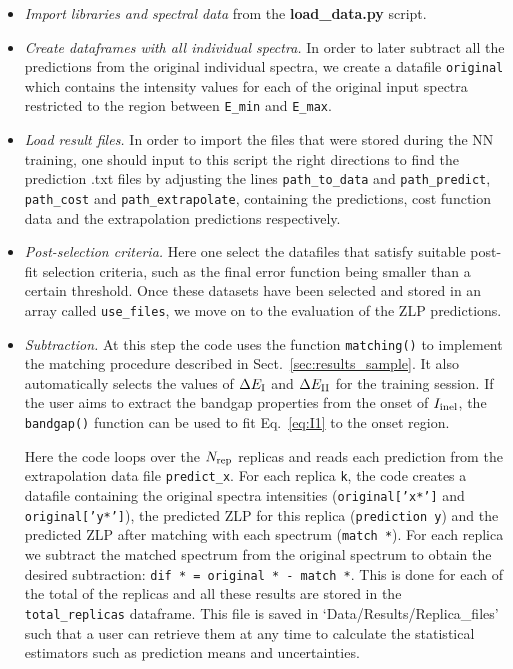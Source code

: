 \begin{itemize}
  
\item {\it Import libraries and spectral data} from the {\bf load\_data.py} script.

\item {\it Create dataframes with all individual spectra.}
In order to later subtract all the predictions from the original individual spectra, we create a datafile
{\tt original} which contains the intensity values for each of the original input spectra restricted to the region between
 {\tt E\_min} and {\tt E\_max}.

\item {\it Load result files.}
In order to import the files that were stored during the NN training, 
one should input to this script the right directions to find the prediction .txt files
by adjusting the lines {\tt path\_to\_data} and {\tt path\_predict}, {\tt path\_cost} and {\tt path\_extrapolate}, 
containing the predictions, cost function data and the extrapolation predictions respectively.

\item {\it Post-selection criteria.}
  Here one select the datafiles that satisfy suitable post-fit selection
  criteria, such as the final error function being smaller
  than a certain threshold. 
Once these datasets have been selected and stored in an array called {\tt use\_files},
we move on to the evaluation of the ZLP predictions. 

\item {\it Subtraction.}
 At this step the code uses the function {\tt matching()} to
  implement the matching procedure
  described in Sect.~\ref{sec:results_sample}.
  It also automatically selects the
  values of $\Delta E_{\rm I}$ and $\Delta E_{\rm II}$ for the training session.
  If the user aims to extract the bandgap properties
  from the onset of $I_{\rm inel}$, 
  the  {\tt bandgap()} function can be used to
  fit Eq.~\ref{eq:I1} to the onset region.

Here the code loops over the $N_{\rm rep}$ replicas and reads each prediction from the extrapolation data file {\tt predict\_x}.
%
For each replica {\tt k}, the code creates a datafile containing the original spectra intensities 
({\tt original['x*']} and {\tt original['y*']}), the predicted ZLP for this replica ({\tt prediction y}) 
and the predicted ZLP after matching with each spectrum ({\tt match *}). 
%
For each replica we subtract the matched spectrum from the original spectrum 
to obtain the desired subtraction: {\tt dif * = original * - match *}. 
%
This is done for each of the total of the replicas and all these results are stored in the  {\tt total\_replicas} dataframe. 
%
This file is saved in `Data/Results/Replica\_files' such that a user
can retrieve them  at any time to calculate the
statistical estimators such as prediction means and uncertainties. 


\end{itemize}
